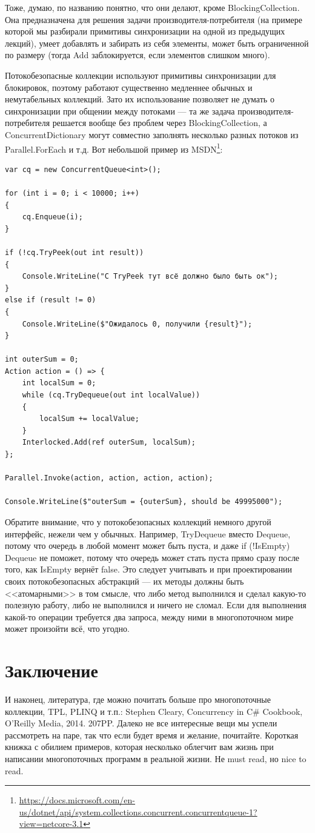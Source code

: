 \documentclass[a5paper]{article}
\begin{document}
Тоже, думаю, по названию понятно, что они делают, кроме BlockingCollection. Она предназначена для решения задачи производителя-потребителя (на примере которой мы разбирали примитивы синхронизации на одной из предыдущих лекций), умеет добавлять и забирать из себя элементы, может быть ограниченной по размеру (тогда Add заблокируется, если элементов слишком много).

Потокобезопасные коллекции используют примитивы синхронизации для блокировок, поэтому работают существенно медленнее обычных и немутабельных коллекций. Зато их использование позволяет не думать о синхронизации при общении между потоками --- та же задача производителя-потребителя решается вообще без проблем через BlockingCollection, а ConcurrentDictionary могут совместно заполнять несколько разных потоков из Parallel.ForEach и т.д. Вот небольшой пример из MSDN\footnote{\url{https://docs.microsoft.com/en-us/dotnet/api/system.collections.concurrent.concurrentqueue-1?view=netcore-3.1}}:

\begin{verbatim}
var cq = new ConcurrentQueue<int>();

for (int i = 0; i < 10000; i++) 
{
    cq.Enqueue(i);
}

if (!cq.TryPeek(out int result))
{
    Console.WriteLine("С TryPeek тут всё должно было быть ок");
}
else if (result != 0)
{
    Console.WriteLine($"Ожидалось 0, получили {result}");
}

int outerSum = 0;
Action action = () => {
    int localSum = 0;
    while (cq.TryDequeue(out int localValue)) 
    {
        localSum += localValue;
    }
    Interlocked.Add(ref outerSum, localSum);
};

Parallel.Invoke(action, action, action, action);

Console.WriteLine($"outerSum = {outerSum}, should be 49995000");
\end{verbatim}

Обратите внимание, что у потокобезопасных коллекций немного другой интерфейс, нежели чем у обычных. Например, TryDequeue вместо Dequeue, потому что очередь в любой момент может быть пуста, и даже if (!IsEmpty) Dequeue не поможет, потому что очередь может стать пуста прямо сразу после того, как IsEmpty вернёт false. Это следует учитывать и при проектировании своих потокобезопасных абстракций --- их методы должны быть <<атомарными>> в том смысле, что либо метод выполнился и сделал какую-то полезную работу, либо не выполнился и ничего не сломал. Если для выполнения какой-то операции требуется два запроса, между ними в многопоточном мире может произойти всё, что угодно.

\section{Заключение}

И наконец, литература, где можно почитать больше про многопоточные коллекции, TPL, PLINQ и т.п.: Stephen Cleary, Concurrency in C\# Cookbook, O'Reilly Media, 2014. 207PP. Далеко не все интересные вещи мы успели рассмотреть на паре, так что если будет время и желание, почитайте. Короткая книжка с обилием примеров, которая несколько облегчит вам жизнь при написании многопоточных программ в реальной жизни. Не must read, но nice to read.
\end{document}
